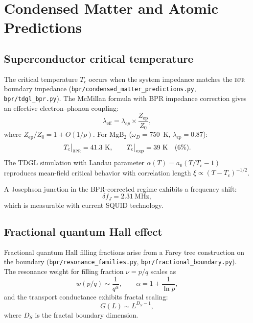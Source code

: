 \documentclass[aps,prd,twocolumn,superscriptaddress,longbibliography,nofootinbib]{revtex4-2}
\newcommand{\Zimp}{Z}
\newcommand{\Zvac}{Z_0}
\newcommand{\bpr}{\textsc{bpr}}
\begin{document}
\section{Condensed Matter and Atomic Predictions}
\label{sec:cmat}

\subsection{Superconductor critical temperature}

The critical temperature $T_c$ occurs when the system impedance
matches the \bpr{} boundary impedance
(\texttt{bpr/condensed\_matter\_predictions.py},
\texttt{bpr/tdgl\_bpr.py}).  The McMillan formula with BPR
impedance correction gives an effective electron--phonon coupling:
\begin{equation}
\lambda_{\mathrm{eff}} = \lambda_{ep} \times
  \frac{\Zimp_{\mathrm{ep}}}{\Zvac},
\label{eq:lambda_eff}
\end{equation}
where $\Zimp_{\mathrm{ep}}/\Zvac = 1 + O(1/p)$.  For MgB$_2$
($\omega_D = 750$~K, $\lambda_{ep} = 0.87$):
\begin{equation}
T_c\big|_{\bpr} = 41.3~\text{K}, \qquad
T_c\big|_{\mathrm{exp}} = 39~\text{K} \quad (6\%).
\label{eq:Tc_mgb2}
\end{equation}
The TDGL simulation with Landau parameter $\alpha(T) = a_0(T/T_c -
1)$ reproduces mean-field critical behavior with correlation length
$\xi \propto (T - T_c)^{-1/2}$.

A Josephson junction in the BPR-corrected regime exhibits a
frequency shift:
\begin{equation}
\delta f_J = 2.31~\text{MHz},
\label{eq:josephson}
\end{equation}
which is measurable with current SQUID technology.

\subsection{Fractional quantum Hall effect}

Fractional quantum Hall filling fractions arise from a Farey tree
construction on the boundary
(\texttt{bpr/resonance\_families.py},
\texttt{bpr/fractional\_boundary.py}).  The resonance weight for
filling fraction $\nu = p/q$ scales as
\begin{equation}
w(p/q) \sim \frac{1}{q^\alpha}, \qquad
\alpha = 1 + \frac{1}{\ln p},
\label{eq:fqhe}
\end{equation}
and the transport conductance exhibits fractal scaling:
\begin{equation}
G(L) \sim L^{D_S - 1},
\label{eq:fqhe_transport}
\end{equation}
where $D_S$ is the fractal boundary dimension.
\end{document}
